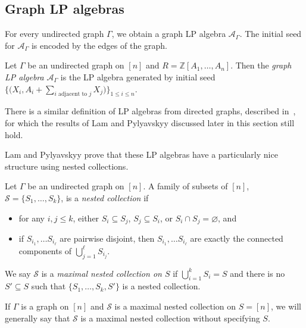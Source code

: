 \documentclass[pdftex]{sigma}
\numberwithin{equation}{section}
\newcommand{\calS}{\mathcal{S}}
\newcommand{\Z}{\mathbb{Z}}
\begin{document}
\subsection{Graph LP algebras}\label{sec:graph-LP}

For every undirected graph $\Gamma$, we obtain a graph LP algebra $\mathcal{A}_\Gamma$. The initial seed for $\mathcal{A}_\Gamma$ is encoded by the edges of the graph.

\begin{Definition}\label{defn:graph-LP}
Let $\Gamma$ be an undirected graph on $[n]$ and $R=\Z[A_1,\dots,A_n]$. Then the \emph{graph LP algebra} $\mathcal{A}_\Gamma$ is the LP algebra generated by initial seed $ \big\{\big(X_i,A_i+\sum_{i\text{ adjacent to }j}X_j\big)\big\}_{1\leq i\leq n}$.
\end{Definition}

\begin{Remark}There is a similar definition of LP algebras from directed graphs, described in~\cite{LP-16}, for which the results of Lam and Pylyavskyy discussed later in this section still hold.
\end{Remark}

Lam and Pylyavskyy prove that these LP algebras have a particularly nice structure using nested collections.

\begin{Definition}\label{defn:nested-coll}
Let $\Gamma$ be an undirected graph on $[n]$. A family of subsets of $[n]$, $\calS=\{S_1,\dots,S_k\}$, is a \emph{nested collection} if
\begin{itemize}\itemsep=0pt
 \item for any $i,j\leq k$, either $S_i\subseteq S_j$, $S_j\subseteq S_i$, or $S_i\cap S_j=\varnothing$, and
 \item if $S_{i_1},\dots S_{i_\ell}$ are pairwise disjoint, then $S_{i_1},\dots S_{i_\ell}$ are exactly the connected components of $\bigcup_{j=1}^\ell S_{i_j}$.
\end{itemize}
We say $\calS$ is a \emph{maximal nested collection on $S$} if $\bigcup_{i=1}^k S_i=S$ and there is no $S'\subseteq S$ such that $\{S_1,\dots,S_k,S'\}$ is a nested collection.
\end{Definition}

If $\Gamma$ is a graph on $[n]$ and $\calS$ is a maximal nested collection on $S=[n]$, we will generally say that $\calS$ is a maximal nested collection without specifying $S$.
\end{document}
